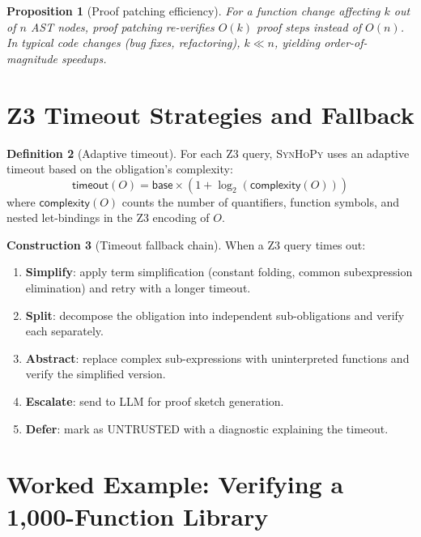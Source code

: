 \documentclass[11pt,a4paper]{report}
\theoremstyle{definition}
\newtheorem{definition}{Definition}[chapter]
\newtheorem{construction}[definition]{Construction}
\theoremstyle{plain}
\newtheorem{proposition}[definition]{Proposition}
\newcommand{\synhopy}{\textsc{SynHoPy}}
\begin{document}
\begin{proposition}[Proof patching efficiency]
For a function change affecting $k$ out of $n$ AST nodes, proof patching
re-verifies $O(k)$ proof steps instead of $O(n)$.  In typical code changes
(bug fixes, refactoring), $k \ll n$, yielding order-of-magnitude speedups.
\end{proposition}


\section{Z3 Timeout Strategies and Fallback}

\begin{definition}[Adaptive timeout]
For each Z3 query, \synhopy{} uses an adaptive timeout based on the obligation's
complexity:
\[
  \mathsf{timeout}(O) = \mathsf{base} \times (1 + \log_2(\mathsf{complexity}(O)))
\]
where $\mathsf{complexity}(O)$ counts the number of quantifiers, function symbols,
and nested let-bindings in the Z3 encoding of $O$.
\end{definition}

\begin{construction}[Timeout fallback chain]
When a Z3 query times out:
\begin{enumerate}
  \item \textbf{Simplify}: apply term simplification (constant folding, common subexpression
    elimination) and retry with a longer timeout.
  \item \textbf{Split}: decompose the obligation into independent sub-obligations
    and verify each separately.
  \item \textbf{Abstract}: replace complex sub-expressions with uninterpreted
    functions and verify the simplified version.
  \item \textbf{Escalate}: send to LLM for proof sketch generation.
  \item \textbf{Defer}: mark as UNTRUSTED with a diagnostic explaining the timeout.
\end{enumerate}
\end{construction}


\section{Worked Example: Verifying a 1,000-Function Library}
\end{document}
